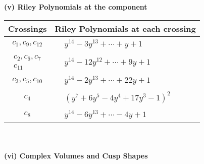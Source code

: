 \documentclass[1p]{elsarticle_modified}
\theoremstyle{definition}
\begin{document}
\newpage\renewcommand{\arraystretch}{1}
\flushleft \textbf{(v) Riley Polynomials at the component}\newline \\
\begin{tabular}{m{50pt}|m{274pt}}
Crossings & \hspace{64pt}Riley Polynomials at each crossing \\
\hline $$\begin{aligned}c_{1},c_{9},c_{12}\end{aligned}$$&$\begin{aligned}
&y^{14}-3 y^{13}+\cdots+y+1
\end{aligned}$\\
\hline $$\begin{aligned}c_{2},c_{6},c_{7}\\c_{11}\end{aligned}$$&$\begin{aligned}
&y^{14}-12 y^{12}+\cdots+9 y+1
\end{aligned}$\\
\hline $$\begin{aligned}c_{3},c_{5},c_{10}\end{aligned}$$&$\begin{aligned}
&y^{14}-2 y^{13}+\cdots+22 y+1
\end{aligned}$\\
\hline $$\begin{aligned}c_{4}\end{aligned}$$&$\begin{aligned}
&(y^7+6 y^5-4 y^4+17 y^3-1)^2
\end{aligned}$\\
\hline $$\begin{aligned}c_{8}\end{aligned}$$&$\begin{aligned}
&y^{14}-6 y^{13}+\cdots-4 y+1
\end{aligned}$\\
\hline
\end{tabular}\\~\\
\newpage\flushleft \textbf{(vi) Complex Volumes and Cusp Shapes}
\end{document}
